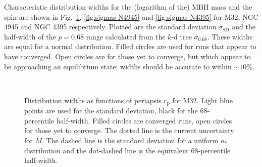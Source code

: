 \documentclass[useAMS,usedcolumn,usegraphicx,usenatbib]{mn2e}
\newcommand{\figref}[1]{Fig.~\ref{fig:#1}}
\newcommand{\sub}[1]{\ensuremath{_\mathrm{#1}}}
\begin{document}
Characteristic distribution widths for the (logarithm of the) MBH mass and the spin are shown in \figref{sigmas-M32}, \ref{fig:sigmas-N4945} and \ref{fig:sigmas-N4395} for M32, NGC 4945 and NGC 4395 respectively. Plotted are the standard deviation $\sigma\sub{SD}$ and the half-width of the $p = 0.68$ range calculated from the $k$-d tree $\sigma_{0.68}$. These widths are equal for a normal distribution. Filled circles are used for runs that appear to have converged. Open circles are for those yet to converge, but which appear to be approaching an equilibrium state; widths should be accurate to within $\sim 10\%$.
\begin{figure}
\begin{center}
 \quad
{} \\
\caption{Distribution widths as functions of periapsis $r\sub{p}$ for M32. Light blue points are used for the standard deviation, black for the $68$-percentile half-width. Filled circles are converged runs, open circles for those yet to converge. The dotted line is the current uncertainty for $M$. The dashed line is the standard deviation for a uniform $a_\ast$ distribution and the dot-dashed line is the equivalent $68$-percentile half-width.\label{fig:sigmas-M32}}
\end{center}
\end{figure}
\end{document}
